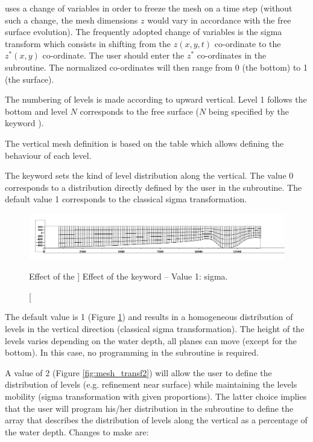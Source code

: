  uses a change of variables in order to freeze the mesh on a time
step (without such a change, the mesh dimensions $z$ would vary in
accordance with the free surface evolution). The frequently adopted change of
variables is the sigma transform which consists in shifting from the $z(x,y,t)$
co-ordinate to the $z^{*} (x,y)$ co-ordinate.
The user should enter the $z^{*}$ co-ordinates in the 
subroutine.
The normalized co-ordinates will then range from 0 (the bottom) to 1 (the surface).

The numbering of levels is made according to upward vertical. Level 1 follows
the bottom and level $N$ corresponds to the free surface ($N$
being specified by the keyword ).

The vertical mesh definition is based on the  table which
allows defining the behaviour of each level.

The keyword  sets the kind of level distribution
along the vertical. The value 0 corresponds to a distribution directly defined
by the user in the  subroutine.
The default value 1 corresponds to the classical sigma transformation.

\begin{figure}[H]%
\begin{center}
%
  \includegraphics[width=\textwidth]{./graphics/mesh_transformation}
%
\end{center}
\caption
[Effect of the ]
{Effect of the  keyword -- Value 1: sigma.}
\label{fig:mesh_transf}
\end{figure}

The default value is 1 (Figure \ref{fig:mesh_transf}) and results in a
homogeneous distribution of levels in the vertical direction (classical sigma
transformation). The height of the levels varies depending on the water depth,
all planes can move (except for the bottom). In this case, no programming in
the  subroutine is required.

A value of 2 (Figure \ref{fig:mesh_transf2}) will allow the user to define the
distribution of levels (e.g. refinement near surface) while maintaining the
levels mobility (sigma transformation with given proportions). The latter
choice implies that the user will program his/her distribution in the
 subroutine to define the array 
that describes
the distribution of levels along the vertical as a percentage of the water depth.
Changes to make are:

